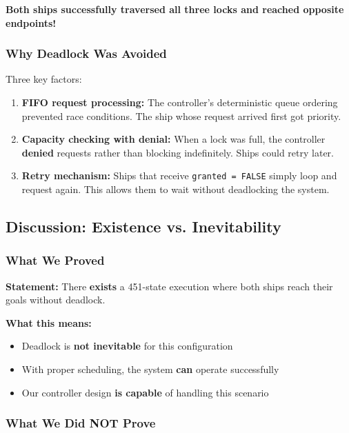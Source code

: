 \documentclass[12pt,a4paper]{article}
\begin{document}
\textbf{Both ships successfully traversed all three locks and reached opposite endpoints!}

\subsubsection{Why Deadlock Was Avoided}

Three key factors:

\begin{enumerate}
    \item \textbf{FIFO request processing:} The controller's deterministic queue ordering prevented race conditions. The ship whose request arrived first got priority.
    
    \item \textbf{Capacity checking with denial:} When a lock was full, the controller \textbf{denied} requests rather than blocking indefinitely. Ships could retry later.
    
    \item \textbf{Retry mechanism:} Ships that receive \texttt{granted = FALSE} simply loop and request again. This allows them to wait without deadlocking the system.
\end{enumerate}

\subsection{Discussion: Existence vs. Inevitability}

\subsubsection{What We Proved}

\textbf{Statement:} There \textbf{exists} a 451-state execution where both ships reach their goals without deadlock.

\textbf{What this means:}
\begin{itemize}
    \item Deadlock is \textbf{not inevitable} for this configuration
    \item With proper scheduling, the system \textbf{can} operate successfully
    \item Our controller design \textbf{is capable} of handling this scenario
\end{itemize}

\subsubsection{What We Did NOT Prove}
\end{document}
